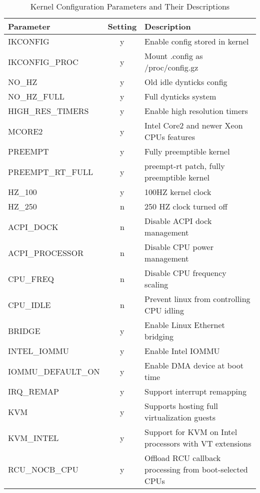 \begin{table}
    \centering
    \caption{Kernel Configuration Parameters and Their Descriptions}
    \label{tab:kernel_config_table}
\begin{tabular}{|l|c|p{8cm}|}
\hline
Parameter & Setting & Description \\
\hline 
\hline
IKCONFIG & y          &   Enable config stored in kernel \\
IKCONFIG\_PROC & y    &   Mount .config as /proc/config.gz \\
NO\_HZ & y            &   Old idle dynticks config \\
NO\_HZ\_FULL & y      &   Full dynticks system \\
HIGH\_RES\_TIMERS & y &   Enable high resolution timers\\
MCORE2 & y            &   Intel Core2 and newer Xeon CPUs features\\
PREEMPT & y           &   Fully preemptible kernel \\
PREEMPT\_RT\_FULL & y &   preempt-rt patch, fully preemptible kernel \\
HZ\_100 & y           &   100HZ kernel clock \\
HZ\_250 & n           &   250 HZ clock turned off \\
ACPI\_DOCK & n        &   Disable ACPI dock management \\
ACPI\_PROCESSOR & n   &   Disable CPU power management \\
CPU\_FREQ & n         &   Disable CPU frequency scaling \\
CPU\_IDLE & n         &   Prevent linux from controlling CPU idling \\
BRIDGE & y            &   Enable Linux Ethernet bridging \\
INTEL\_IOMMU & y      &   Enable Intel IOMMU  \\
IOMMU\_DEFAULT\_ON & y&   Enable DMA device at boot time \\
IRQ\_REMAP & y        &   Support interrupt remapping \\
KVM & y               &   Supports hosting full virtualization guests \\
KVM\_INTEL & y        &   Support for KVM on Intel processors with VT extensions \\
RCU\_NOCB\_CPU & y    &   Offload RCU callback processing from boot-selected CPUs\\
\hline
\end{tabular}
\end{table}
